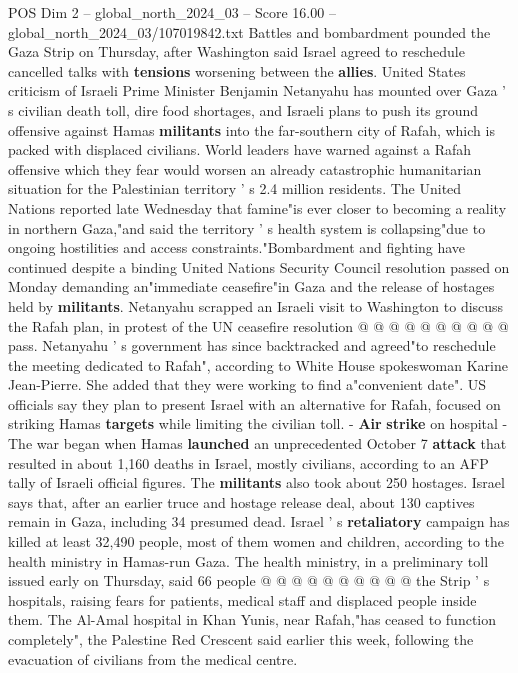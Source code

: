 \begin{textsample}{POS Dim 2 – global\_north\_2024\_03 – Score 16.00 – global\_north\_2024\_03/107019842.txt}  \label{ex:f2_pos_370}
Battles and bombardment pounded the Gaza Strip on Thursday, after Washington said Israel agreed to reschedule cancelled talks with \textbf{tensions} worsening between the \textbf{allies}.
United States criticism of Israeli Prime Minister Benjamin Netanyahu has mounted over Gaza ' s civilian death toll, dire food shortages, and Israeli plans to push its ground offensive against Hamas \textbf{militants} into the far-southern city of Rafah, which is packed with displaced civilians.
World leaders have warned against a Rafah offensive which they fear would worsen an already catastrophic humanitarian situation for the Palestinian territory ' s 2.4 million residents.
The United Nations reported late Wednesday that famine"is ever closer to becoming a reality in northern Gaza,"and said the territory ' s health system is collapsing"due to ongoing hostilities and access constraints."Bombardment and fighting have continued despite a binding United Nations Security Council resolution passed on Monday demanding an"immediate ceasefire"in Gaza and the release of hostages held by \textbf{militants}.
Netanyahu scrapped an Israeli visit to Washington to discuss the Rafah plan, in protest of the UN ceasefire resolution @ @ @ @ @ @ @ @ @ @ pass.
Netanyahu ' s government has since backtracked and agreed"to reschedule the meeting dedicated to Rafah", according to White House spokeswoman Karine Jean-Pierre.
She added that they were working to find a"convenient date".
US officials say they plan to present Israel with an alternative for Rafah, focused on striking Hamas \textbf{targets} while limiting the civilian toll. - \textbf{Air} \textbf{strike} on hospital - The war began when Hamas \textbf{launched} an unprecedented October 7 \textbf{attack} that resulted in about 1,160 deaths in Israel, mostly civilians, according to an AFP tally of Israeli official figures.
The \textbf{militants} also took about 250 hostages.
Israel says that, after an earlier truce and hostage release deal, about 130 captives remain in Gaza, including 34 presumed dead.
Israel ' s \textbf{retaliatory} campaign has killed at least 32,490 people, most of them women and children, according to the health ministry in Hamas-run Gaza.
The health ministry, in a preliminary toll issued early on Thursday, said 66 people @ @ @ @ @ @ @ @ @ @ the Strip ' s hospitals, raising fears for patients, medical staff and displaced people inside them.
The Al-Amal hospital in Khan Yunis, near Rafah,"has ceased to function completely", the Palestine Red Crescent said earlier this week, following the evacuation of civilians from the medical centre.

\end{textsample}
